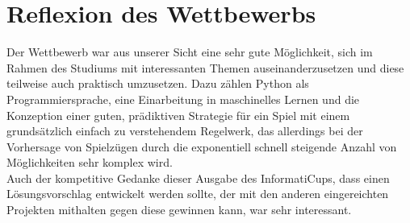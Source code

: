 
\section{Reflexion des Wettbewerbs}
\label{sec:reflexion}

Der Wettbewerb war aus unserer Sicht eine sehr gute Möglichkeit, sich im Rahmen des Studiums mit interessanten Themen
auseinanderzusetzen und diese teilweise auch praktisch umzusetzen.
Dazu zählen \ua Python als Programmiersprache, eine Einarbeitung in maschinelles Lernen und die Konzeption einer
guten, prädiktiven Strategie für ein Spiel mit einem grundsätzlich einfach zu verstehendem Regelwerk, das allerdings
bei der Vorhersage von Spielzügen durch die exponentiell schnell steigende Anzahl von Möglichkeiten sehr komplex wird.
\\

Auch der kompetitive Gedanke dieser Ausgabe des InformatiCups, dass einen Lösungsvorschlag entwickelt werden sollte,
der mit den anderen eingereichten Projekten mithalten \bzw gegen diese gewinnen kann, war sehr interessant.
